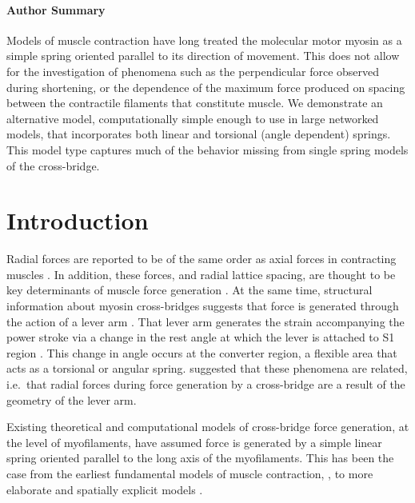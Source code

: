 \documentclass[]{article}
\begin{document}
\paragraph*{Author Summary} %
Models of muscle contraction have long treated the molecular motor myosin as a simple spring oriented parallel to its direction of movement. 
This does not allow for the investigation of phenomena such as the perpendicular force observed during shortening, or the dependence of the maximum force produced on spacing between the contractile filaments that constitute muscle.
We demonstrate an alternative model, computationally simple enough to use in large networked models, that incorporates both linear and torsional (angle dependent) springs. 
This model type captures much of the behavior missing from single spring models of the cross-bridge.


\section*{Introduction} %

Radial forces are reported to be of the same order as axial forces in contracting muscles \citep{Cecchi1990, Millman1998}. 
In addition, these forces, and radial lattice spacing, are thought to be key determinants of muscle force generation \citep{Fuchs2005}. 
At the same time, structural information about myosin cross-bridges suggests that force is generated through the action of a lever arm \citep{Rayment1993, Uyeda1996, Huxley2000}.
That lever arm generates the strain accompanying the power stroke via a change in the rest angle at which the lever is attached to S1 region \citep{Huxley2000, Houdusse2001}. 
This change in angle occurs at the converter region, a flexible area that acts as a torsional or angular spring. 
\citet{Schoenberg1980b} suggested that these phenomena are related, i.e.\ that radial forces during force generation by a cross-bridge are a result of the geometry of the lever arm. 

Existing theoretical and computational models of cross-bridge force generation, at the level of myofilaments, have assumed force is generated by a simple linear spring oriented parallel to the long axis of the myofilaments.  
This has been the case from the earliest fundamental models of muscle contraction, \citet{Huxley1957}, to more elaborate and spatially explicit models \citep{Daniel1998, Chase2004, Tanner2007, Smith2008a, Campbell2009}.  
\end{document}
